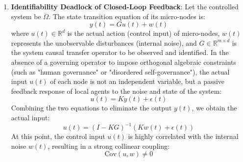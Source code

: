 \documentclass[11pt,a4paper]{article}
\begin{document}
\begin{enumerate}
    \item \textbf{Identifiability Deadlock of Closed-Loop Feedback}:
    Let the controlled system be $\Omega$. The state transition equation of its micro-nodes is:
    \begin{equation}
        y(t) = G u(t) + w(t)
    \end{equation}
    where $u(t) \in \mathbb{R}^d$ is the actual action (control input) of micro-nodes, $w(t)$ represents the unobservable disturbances (internal noise), and $G \in \mathbb{R}^{m \times d}$ is the system causal transfer operator to be observed and identified.
    In the absence of a governing operator to impose orthogonal algebraic constraints (such as "human governance" or "disordered self-governance"), the actual input $u(t)$ of each node is not an independent variable, but a passive feedback response of local agents to the noise and state of the system:
    \begin{equation}
        u(t) = K y(t) + \epsilon(t)
    \end{equation}
    Combining the two equations to eliminate the output $y(t)$, we obtain the actual input:
    \begin{equation}
        u(t) = (I - KG)^{-1} (Kw(t) + \epsilon(t))
    \end{equation}
    At this point, the control input $u(t)$ is highly correlated with the internal noise $w(t)$, resulting in a strong collinear coupling:
    \begin{equation}
        \text{Cov}(u, w) \neq 0
    \end{equation}
    

\end{enumerate}
\end{document}
